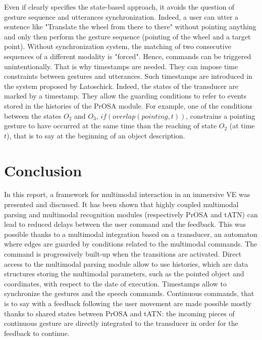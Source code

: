\documentclass[a4paper]{article}
\begin{document}
Even if \cite{state-based} clearly specifies the state-based approach, it avoids the question of gesture sequence and utterances synchronization. Indeed, a user can utter a sentence like "Translate the wheel from there to there" without pointing anything and only then perform the gesture sequence (pointing of the wheel and a target point). Without synchronization system, the matching of two consecutive sequences of a different modality is "forced". Hence, commands can be triggered unintentionally. That is why timestamps are needed. They can impose time constraints between gestures and utterances. Such timestamps are introduced in the system proposed by Latoschick. Indeed, the states of the transducer are marked by a timestamp. They allow the guarding conditions to refer to events stored in the histories of the PrOSA module. For example, one of the conditions between the states $O_2$ and $O_3$, $if(overlap(pointing, t))$, constrains a pointing gesture to have occurred at the same time than the reaching of state $O_2$ (at time $t$), that is to say at the beginning of an object description.

\section{Conclusion}

In this report, a framework for multimodal interaction in an immersive VE was presented and discussed. It has been shown that highly coupled multimodal parsing and multimodal recognition modules (respectively PrOSA and tATN) can lead to reduced delays between the user command and the feedback. This was possible thanks to a multimodal integration based on a transducer, an automaton where edges are guarded by conditions related to the multimodal commands. The command is progressively built-up when the transitions are activated. Direct access to the multimodal parsing module allow to use histories, which are data structures storing the multimodal parameters, such as the pointed object and coordinates, with respect to the date of execution. Timestamps allow to synchronize the gestures and the speech commands. Continuous commands, that is to say with a feedback following the user movement are made possible mostly thanks to shared states between PrOSA and tATN: the incoming pieces of continuous gesture are directly integrated to the transducer in order for the feedback to continue. 
\end{document}
